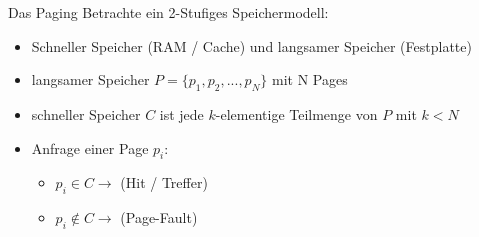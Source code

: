 \begin{frame}[fragile]{Das Paging}
	\pause
	Betrachte ein 2-Stufiges Speichermodell:
	\begin{itemize}
		\pause
		\item <3-> Schneller Speicher (RAM / Cache) und langsamer Speicher (Festplatte)
		\item <4-> langsamer Speicher $P = \{p_1,p_2,. . .,p_N\}$ mit N Pages
		\item <5-> schneller Speicher $C$ ist jede $k$-elementige Teilmenge von $P$ mit $k < N$
		\item <6-> Anfrage einer Page $p_i$:
		\begin{itemize}
			\item $p_i \in C \rightarrow$ (Hit / Treffer) 
			\item $p_i \not\in C \rightarrow$ (Page-Fault)
		\end{itemize}
	\end{itemize}
\end{frame}